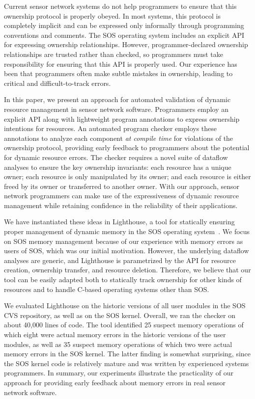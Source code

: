 Current sensor network systems do not help programmers to ensure that
this ownership protocol is properly obeyed.  In most systems, this
protocol is completely implicit and can be expressed only informally
through programming conventions and comments.  The SOS operating
system includes an explicit API for expressing ownership
relationships.  However, programmer-declared ownership relationships
are trusted rather than checked, so programmers must take responsibility for
ensuring that this API is properly used.  Our experience has been that
programmers often make subtle mistakes in ownership,
leading to critical and difficult-to-track errors.  

In this paper, we present an approach for automated validation of dynamic
resource management in sensor network software.  Programmers employ an
explicit API along with lightweight program annotations to express
ownership intentions for resources.  An automated program checker employs these
annotations to analyze each component {\em
at compile time} for violations of the ownership protocol, providing
early feedback to programmers about the potential for dynamic resource
errors.  The checker requires a novel suite of dataflow analyses to ensure
the key ownership invariants:  each resource has a unique owner; each
resource is only manipulated by its owner; and each resource is either
freed by its owner or transferred to another owner.  With our approach,
sensor network programmers can make use of the expressiveness of
dynamic resource management while retaining confidence in the
reliability of their applications.

We have instantiated these ideas in Lighthouse, a tool for statically ensuring
proper management of dynamic memory in the SOS operating
system~\cite{sos}. 
We focus on SOS memory management because of our experience with
memory errors as users of SOS, which was our initial motivation.
However, the underlying dataflow analyses are generic, and Lighthouse is
parametrized by the API for resource creation, ownership transfer, and
resource deletion.  Therefore, we believe that our tool can be easily
adapted both to statically track ownership for other kinds of
resources and to handle C-based operating systems other than SOS.

We evaluated Lighthouse on the historic versions of all user modules in
the SOS CVS repository, as well as on the SOS kernel.  Overall, we ran
the checker on about 40,000 lines of code.  The tool identified 25
suspect memory operations of which eight were actual memory errors in the
historic versions of the user modules, as well as 35 suspect memory
operations of which two were actual memory errors in the SOS kernel.
The latter finding is somewhat surprising, since the SOS kernel code
is relatively mature and was written by experienced systems programmers.
In summary, our experiments illustrate the practicality of our
approach for providing early feedback about memory errors in real
sensor network software.

